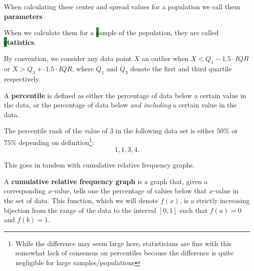 \begin{blackbox}
    \begin{definition}
        When calculating these center and spread values for a \colorbox{Cerulean}{p}opulation we
        call them \textbf{\colorbox{Cerulean}{p}arameters}

        When we calculate them for a \colorbox{ForestGreen}{s}ample of the
        population, they are called \textbf{\colorbox{ForestGreen}{s}tatistics}.
    \end{definition}
\end{blackbox}

By convention, we consider any data point \( X \) an outlier when \( X < Q_1 -
1.5 \cdot IQR \) or \( X > Q_3 + \cdot 1.5 \cdot IQR \), where \( Q_1 \) and \(
Q_3 \) denote the first and third quartile respectively.

\begin{blackbox}
    \begin{definition}
        A \textbf{percentile} is defined as either the percentage of data below
        a certain value in the data, or the percentage of data below
        \textit{and including} a certain value in the data.
    \end{definition}
\end{blackbox}

\begin{example}
    The percentile rank of the value of \( 3 \) in the following data set is
    either \( 50\% \) or \( 75\% \) depending on definition\footnote{While the
        difference may seem large here, statisticians are fine with this
        somewhat lack of consensus on percentiles because the difference is
        quite negligible for large samples/populations}:
    \[
        1, 1, 3, 4
    .\]
\end{example}

This goes in tandem with cumulative relative frequency graphs.

\begin{blackbox}
    \begin{definition}
        A \textbf{cumulative relative frequency graph} is a graph that, given a
        corresponding \( x \)-value, tells one the percentage of values below
        that \( x \)-value in the set of data. This function, which we will denote \( f \left( x \right) \), is a strictly increasing bijection from the range of the data to the interval \( \left[ 0, 1 \right] \) such that \( f \left( a \right) = 0 \) and \( f \left( b \right) = 1 \).
    \end{definition}
\end{blackbox}

